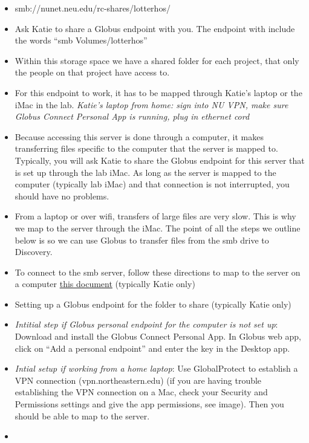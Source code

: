 \documentclass[
  letterpaper,
  DIV=11,
  numbers=noendperiod]{scrreprt}
\begin{document}
\begin{itemize}
\item
  smb://nunet.neu.edu/rc-shares/lotterhos/
\item
  Ask Katie to share a Globus endpoint with you. The endpoint with
  include the words ``smb Volumes/lotterhos''
\item
  Within this storage space we have a shared folder for each project,
  that only the people on that project have access to.
\item
  For this endpoint to work, it has to be mapped through Katie's laptop
  or the iMac in the lab. \emph{Katie's laptop from home: sign into NU
  VPN, make sure Globus Connect Personal App is running, plug in
  ethernet cord}
\item
  Because accessing this server is done through a computer, it makes
  transferring files specific to the computer that the server is mapped
  to. Typically, you will ask Katie to share the Globus endpoint for
  this server that is set up through the lab iMac. As long as the server
  is mapped to the computer (typically lab iMac) and that connection is
  not interrupted, you should have no problems.
\item
  From a laptop or over wifi, transfers of large files are very slow.
  This is why we map to the server through the iMac. The point of all
  the steps we outline below is so we can use Globus to transfer files
  from the smb drive to Discovery.
\item
  To connect to the smb server, follow these directions to map to the
  server on a computer
  \href{https://drk-lo.github.io/lotterhoslabprotocols/discovery_3-storage/accessing_shared_storage_2020.pdf}{this
  document} (typically Katie only)
\item
  Setting up a Globus endpoint for the folder to share (typically Katie
  only)
\item
  \emph{Intitial step if Globus personal endpoint for the computer is
  not set up}: Download and install the Globus Connect Personal App. In
  Globus web app, click on ``Add a personal endpoint'' and enter the key
  in the Desktop app.
\item
  \emph{Intial setup if working from a home laptop}: Use GlobalProtect
  to establish a VPN connection (vpn.northeastern.edu) (if you are
  having trouble establishing the VPN connection on a Mac, check your
  Security and Permissions settings and give the app permissions, see
  image). Then you should be able to map to the server.
\item

\end{itemize}
\end{document}
